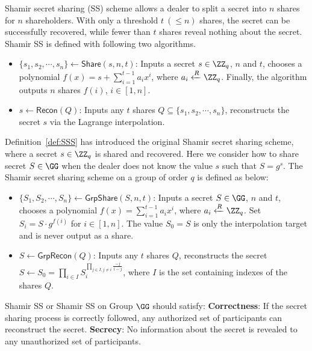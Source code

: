 \documentclass[runningheads]{llncs}
\newcommand{\shamirShare}{\mathsf{Share}}
\newcommand{\shamirRecon}{\mathsf{Recon}}
\newcommand{\shamirGShare}{\mathsf{GrpShare}}
\newcommand{\shamirGRecon}{\mathsf{GrpRecon}}
\begin{document}
\begin{definition}[Shamir SS]\label{def:SSS}
Shamir secret sharing (SS) scheme allows a dealer to split a secret into $n$ shares for $n$ shareholders. With only a threshold $t\ (\leq n)$ shares, the secret can be successfully recovered, while fewer than $t$ shares reveal nothing about the secret. Shamir SS is defined with following two algorithms.
\begin{itemize}
    \item $\{s_1,s_2,\cdots,s_n\} \gets \shamirShare(s,n,t)$: Inputs a secret $s\in\ZZ_q$, $n$ and $t$, chooses a polynomial $f(x)=s+\sum_{i=1}^{t-1} a_i x^i$, where $a_i\xleftarrow[]{R} \ZZ_q$. Finally, the algorithm outputs $n$ shares $f(i)$, $i\in[1,n]$.
    \item $s\gets \shamirRecon(Q)$: Inputs any $t$ shares $Q\subseteq \{s_1,s_2,\cdots,s_n\}$, reconstructs the secret $s$ via the Lagrange interpolation.
\end{itemize}

\end{definition}

\begin{definition}\label{def:GShamir}
Definition~\ref{def:SSS} has introduced the original Shamir secret sharing scheme, where a secret $s\in\ZZ_q$ is shared and recovered. Here we consider how to share secret $S\in\GG$ when the dealer does not know the value $s$ such that $S=g^s$. The Shamir secret sharing scheme on a group of order $q$ is defined as below:
\begin{itemize}
    \item $\{S_1,S_2,\cdots,S_n\} \gets \shamirGShare(S,n,t)$: Inputs a secret $S\in\GG$, $n$ and $t$, chooses a polynomial $f(x)=\sum_{i=1}^{t-1} a_i x^i$, where $a_i\xleftarrow[]{R} \ZZ_q$. Set $S_i=S\cdot g^{f(i)}$ for $i\in[1,n]$. The value $S_0=S$ is only the interpolation target and is never output as a share.
    \item $S\gets \shamirGRecon(Q)$: Inputs any $t$ shares $Q$, reconstructs the secret $S \gets S_0 = \prod_{i\in I}S_i^{\prod_{j\in I,j\neq i}\frac{-j}{i-j}}$, where $I$ is the set containing indexes of the shares $Q$.
\end{itemize}
\end{definition}

Shamir SS or Shamir SS on Group $\GG$ should satisfy: \textbf{Correctness}: If the secret sharing process is correctly followed, any authorized set of participants can reconstruct the secret. \textbf{Secrecy}: No information about the secret is revealed to any unauthorized set of participants.
\end{document}
